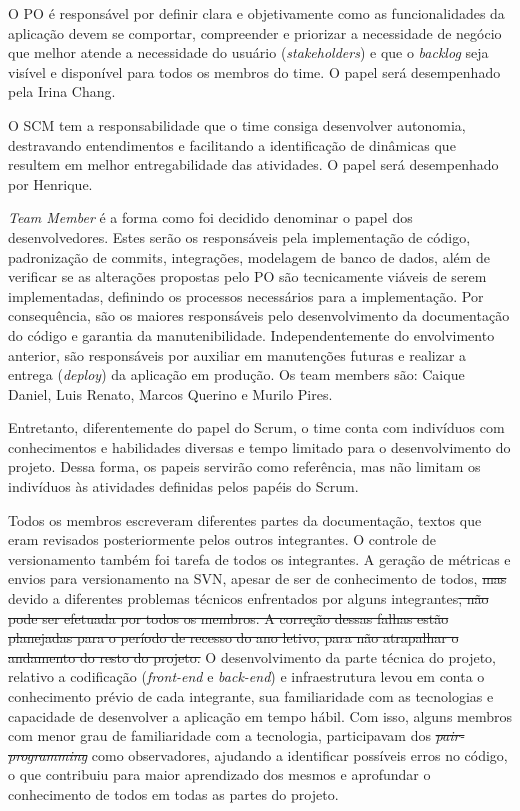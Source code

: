 \documentclass[
    12pt,               %
    openright,          %
    oneside,
    a4paper,            %
    BIBLATEX,           %
    TODO,               %
    english,            %
    brazil              %
    ]{ifsp-spo-inf-ctds}
\providecommand{\DIFadd}[1]{{\protect\color{blue}\uwave{#1}}} %
\providecommand{\DIFdel}[1]{{\protect\color{red}\sout{#1}}}                      %
\providecommand{\DIFaddbegin}{} %
\providecommand{\DIFaddend}{} %
\providecommand{\DIFdelbegin}{} %
\providecommand{\DIFdelend}{} %
\newcommand{\DIFscaledelfig}{0.5}
\newlength{\DIFdelgraphicswidth} %
\newlength{\DIFdelgraphicsheight} %
\newcommand{\DIFaddincludegraphics}[2][]{{\color{blue}\fbox{\DIFOincludegraphics[#1]{#2}}}} %
\newcommand{\DIFdelincludegraphics}[2][]{%
\sbox{\DIFdelgraphicsbox}{\DIFOincludegraphics[#1]{#2}}%
\settoboxwidth{\DIFdelgraphicswidth}{\DIFdelgraphicsbox} %
\settoboxtotalheight{\DIFdelgraphicsheight}{\DIFdelgraphicsbox} %
\scalebox{\DIFscaledelfig}{%
\parbox[b]{\DIFdelgraphicswidth}{\usebox{\DIFdelgraphicsbox}\\[-\baselineskip] \rule{\DIFdelgraphicswidth}{0em}}\llap{\resizebox{\DIFdelgraphicswidth}{\DIFdelgraphicsheight}{%
\setlength{\unitlength}{\DIFdelgraphicswidth}%
\begin{picture}(1,1)%
\thicklines\linethickness{2pt} %
{\color[rgb]{1,0,0}\put(0,0){\framebox(1,1){}}}%
{\color[rgb]{1,0,0}\put(0,0){\line( 1,1){1}}}%
{\color[rgb]{1,0,0}\put(0,1){\line(1,-1){1}}}%
\end{picture}%
}\hspace*{3pt}}} %
} %
\DeclareRobustCommand{\DIFaddbegin}{\DIFOaddbegin \let\includegraphics\DIFaddincludegraphics} %
\DeclareRobustCommand{\DIFaddend}{\DIFOaddend \let\includegraphics\DIFOincludegraphics} %
\DeclareRobustCommand{\DIFdelbegin}{\DIFOdelbegin \let\includegraphics\DIFdelincludegraphics} %
\DeclareRobustCommand{\DIFdelend}{\DIFOaddend \let\includegraphics\DIFOincludegraphics} %
\begin{document}
            O PO é responsável por definir clara e objetivamente como as funcionalidades da aplicação devem se comportar, compreender e priorizar a necessidade de negócio que melhor atende a necessidade do usuário (\emph{stakeholders}) e que o \emph{backlog }seja visível e disponível para todos os membros do time. O papel será desempenhado pela Irina Chang.

            O SCM tem a responsabilidade que o time consiga desenvolver autonomia, destravando entendimentos e facilitando a identificação de dinâmicas que resultem em melhor entregabilidade das atividades. O papel será desempenhado por Henrique.

            \emph{Team Member} é a forma como foi decidido denominar o papel dos desenvolvedores. Estes serão os responsáveis pela implementação de código, padronização de commits, integrações, modelagem de banco de dados, além de verificar se as alterações propostas pelo PO são tecnicamente viáveis de serem implementadas, definindo os processos necessários para a implementação. Por consequência, são os maiores responsáveis pelo desenvolvimento da documentação do código e garantia da manutenibilidade. Independentemente do envolvimento anterior, são responsáveis por auxiliar em  manutenções futuras e realizar a entrega (\emph{deploy}) da aplicação em produção. Os team members são: Caique Daniel, Luis Renato, Marcos Querino e Murilo Pires.

            Entretanto, diferentemente do papel do Scrum, o time conta com indivíduos com conhecimentos e habilidades diversas e tempo limitado para o desenvolvimento do projeto. Dessa forma, os papeis servirão como referência, mas não limitam os indivíduos às atividades definidas pelos papéis do Scrum.

            Todos os membros escreveram diferentes partes da documentação, textos que eram revisados posteriormente pelos outros integrantes. O controle de versionamento também foi tarefa de todos os integrantes. A geração de métricas e envios para versionamento na SVN, apesar de ser de conhecimento de todos, \DIFdelbegin \DIFdel{mas }\DIFdelend \DIFaddbegin \DIFadd{não pode ser efetuada por todos os membros, }\DIFaddend devido a diferentes problemas técnicos enfrentados por alguns integrantes\DIFdelbegin \DIFdel{, não pode ser efetuada por todos os membros.
            A correção dessas falhas estão planejadas para o período de recesso do ano letivo, para não atrapalhar o andamento do resto do projeto. }\DIFdelend \DIFaddbegin \DIFadd{.
            }\DIFaddend O desenvolvimento da parte técnica do projeto, relativo a codificação (\emph{front-end} e \emph{back-end}) e infraestrutura levou em conta o conhecimento prévio de cada integrante, sua familiaridade com as tecnologias e capacidade de desenvolver a aplicação em tempo hábil. Com isso, alguns membros com menor grau de familiaridade com a tecnologia, participavam dos \emph{\DIFdelbegin \DIFdel{pair-programming}\DIFdelend \DIFaddbegin \DIFadd{pair-programmings}\DIFaddend } como observadores, ajudando a identificar possíveis erros no código, o que contribuiu para maior aprendizado dos mesmos e aprofundar o conhecimento de todos em todas as partes do projeto.
\end{document}
